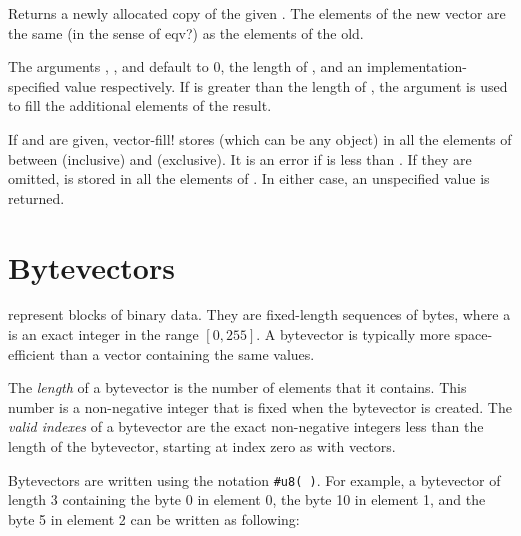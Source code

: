 \begin{entry}{%
}

Returns a newly allocated copy of the given .
The elements of the new vector are the same (in the sense of
{\cf eqv?}) as the elements of the old.

The arguments , , and 
default to 0, the length of , and an implementation-specified
value respectively.
If  is greater than the length of , the
 argument is used to fill the additional elements of the result.

\end{entry}


\begin{entry}{%
}

If  and  are given, {\cf vector-fill!} stores 
(which can be any object) in all the elements of 
between  (inclusive) and  (exclusive).
It is an error if  is less than .
If they are omitted,  is stored in all the elements of .
In either case, an unspecified value is returned.
\end{entry}


\section{Bytevectors}
\label{bytevectorsection}

 represent blocks of binary data.
They are fixed-length sequences of bytes, where
a  is an exact integer in the range $[0, 255]$.
A bytevector is typically more space-efficient than a vector
containing the same values.

\vest The {\em length} of a bytevector is the number of elements that it
contains.  This number is a non-negative integer that is fixed when
the bytevector is created.  The {\em valid indexes} of
a bytevector are the exact non-negative integers less than the length of the
bytevector, starting at index zero as with vectors.

Bytevectors are written using the notation {\tt\#u8( \dotsfoo)}.
For example, a bytevector of length 3 containing the byte 0 in element
0, the byte 10 in element 1, and the byte 5 in
element 2 can be written as following:

